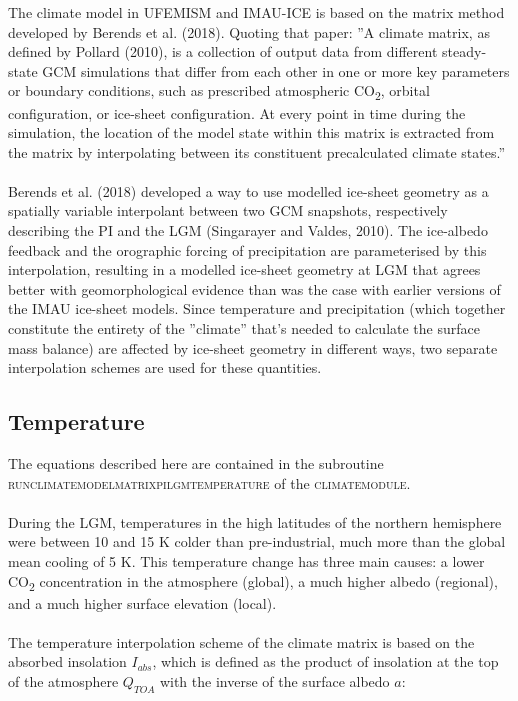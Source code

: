 \documentclass{article}
\begin{document}
The climate model in UFEMISM and IMAU-ICE is based on the matrix method developed by Berends et al. (2018). Quoting that paper: ''A climate matrix, as defined by Pollard (2010), is a collection of output data from different steady-state GCM simulations that differ from each other in one or more key parameters or boundary conditions, such as prescribed atmospheric CO\textsubscript{2}, orbital configuration, or ice-sheet configuration. At every point in time during the simulation, the location of the model state within this matrix is extracted from the matrix by interpolating between its constituent precalculated climate states.''\\
\\
Berends et al. (2018) developed a way to use modelled ice-sheet geometry as a spatially variable interpolant between two GCM snapshots, respectively describing the PI and the LGM (Singarayer and Valdes, 2010). The ice-albedo feedback and the orographic forcing of precipitation are parameterised by this interpolation, resulting in a modelled ice-sheet geometry at LGM that agrees better with geomorphological evidence than was the case with earlier versions of the IMAU ice-sheet models. Since temperature and precipitation (which together constitute the entirety of the ''climate'' that's needed to calculate the surface mass balance) are affected by ice-sheet geometry in different ways, two separate interpolation schemes are used for these quantities.\\

\subsection{Temperature}

The equations described here are contained in the subroutine \textsc{run\textunderscore climate\textunderscore model\textunderscore matrix\textunderscore pi\textunderscore lgm\textunderscore temperature} of the \textsc{climate\textunderscore module}.\\
\\
During the LGM, temperatures in the high latitudes of the northern hemisphere were between 10 and 15 K colder than pre-industrial, much more than the global mean cooling of 5 K. This temperature change has three main causes: a lower CO\textsubscript{2} concentration in the atmosphere (global), a much higher albedo (regional), and a much higher surface elevation (local).\\
\\
The temperature interpolation scheme of the climate matrix is based on the absorbed insolation $I_{abs}$, which is defined as the product of insolation at the top of the atmosphere $Q_{TOA}$ with the inverse of the surface albedo $a$:
\end{document}
